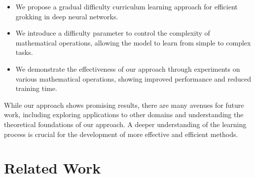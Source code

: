 \documentclass{article} %
\begin{document}
\begin{itemize}
    \item We propose a gradual difficulty curriculum learning approach for efficient grokking in deep neural networks.
    \item We introduce a difficulty parameter to control the complexity of mathematical operations, allowing the model to learn from simple to complex tasks.
    \item We demonstrate the effectiveness of our approach through experiments on various mathematical operations, showing improved performance and reduced training time.
\end{itemize}

While our approach shows promising results, there are many avenues for future work, including exploring applications to other domains and understanding the theoretical foundations of our approach. A deeper understanding of the learning process is crucial for the development of more effective and efficient methods.

\section{Related Work}
\label{sec:related}




\end{document}

